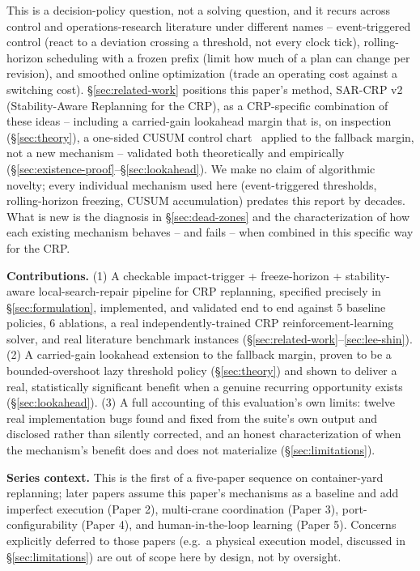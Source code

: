 \documentclass[11pt]{article}
\begin{document}
This is a decision-policy question, not a solving question, and it
recurs across control and operations-research literature under different
names -- event-triggered control (react to a deviation crossing a
threshold, not every clock tick), rolling-horizon scheduling with a
frozen prefix (limit how much of a plan can change per revision), and
smoothed online optimization (trade an operating cost against a switching
cost). \S\ref{sec:related-work} positions this paper's method,
SAR-CRP v2 (Stability-Aware Replanning for the CRP), as a CRP-specific
combination of these ideas -- including a carried-gain lookahead margin
that is, on inspection (\S\ref{sec:theory}), a one-sided CUSUM control
chart~\cite{page1954} applied to the fallback margin, not a new mechanism
-- validated both theoretically and empirically
(\S\ref{sec:existence-proof}--\S\ref{sec:lookahead}). We make no claim of
algorithmic novelty; every individual mechanism used here (event-triggered
thresholds, rolling-horizon freezing, CUSUM accumulation) predates this
report by decades. What is new is the diagnosis in
\S\ref{sec:dead-zones} and the characterization of how each existing
mechanism behaves -- and fails -- when combined in this specific way for
the CRP.

\textbf{Contributions.} (1) A checkable impact-trigger + freeze-horizon +
stability-aware local-search-repair pipeline for CRP replanning, specified
precisely in \S\ref{sec:formulation}, implemented, and validated end to
end against 5 baseline policies, 6 ablations, a real independently-trained
CRP reinforcement-learning solver, and real literature benchmark
instances (\S\ref{sec:related-work}--\ref{sec:lee-shin}). (2) A
carried-gain lookahead extension to the fallback margin, proven to be a
bounded-overshoot lazy threshold policy (\S\ref{sec:theory}) and shown to
deliver a real, statistically significant benefit when a genuine
recurring opportunity exists (\S\ref{sec:lookahead}). (3) A full
accounting of this evaluation's own limits: twelve real implementation
bugs found and fixed from the suite's own output and disclosed rather
than silently corrected, and an honest characterization of when the
mechanism's benefit does and does not materialize (\S\ref{sec:limitations}).

\textbf{Series context.} This is the first of a five-paper sequence on
container-yard replanning; later papers assume this paper's mechanisms as
a baseline and add imperfect execution (Paper 2), multi-crane coordination
(Paper 3), port-configurability (Paper 4), and human-in-the-loop learning
(Paper 5). Concerns explicitly deferred to those papers (e.g.\ a physical
execution model, discussed in \S\ref{sec:limitations}) are out of scope
here by design, not by oversight.
\end{document}
